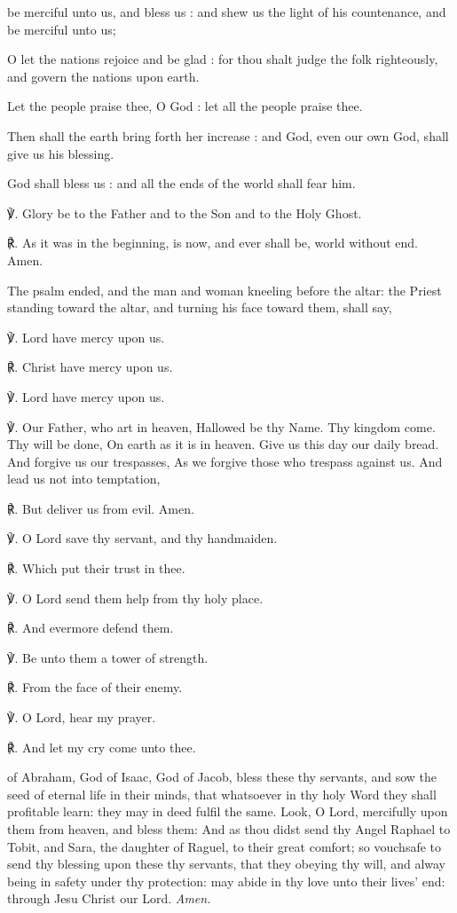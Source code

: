  be merciful unto us, and bless us : and shew us the light of his countenance, and be merciful unto us;\par
{}
O let the nations rejoice and be glad : for thou shalt judge the folk righteously, and govern the nations upon earth.\par
{}Let the people praise thee, O God : let all the people praise thee.\par
{}Then shall the earth bring forth her increase : and God, even our own God, shall give us his blessing.\par
{}God shall bless us : and all the ends of the world shall fear him.\par
    ℣. Glory be to the Father and to the Son and to the Holy Ghost.\par
    ℟. As it was in the beginning, is now, and ever shall be, world without end. Amen.
\begin{rubric}
	The psalm ended, and the man and woman kneeling before the altar: the Priest standing toward the altar, and turning his face toward them, shall say,
\end{rubric}
℣. Lord have mercy upon us.\par
℟. Christ have mercy upon us.\par
℣. Lord have mercy upon us.\par
℣. Our Father, who art in heaven, Hallowed be thy Name. Thy kingdom come. Thy will be done, On earth as it is in heaven. Give us this day our daily bread. And forgive us our trespasses, As we forgive those who trespass against us. And lead us not into temptation,\par
℟. But deliver us from evil. Amen.\par
℣. O Lord save thy servant, and thy handmaiden.\par
℟. Which put their trust in thee.\par
℣. O Lord send them help from thy holy place.\par
℟. And evermore defend them.\par
℣. Be unto them a tower of strength.\par
℟. From the face of their enemy.\par
℣. O Lord, hear my prayer.\par
℟. And let my cry come unto thee.\par
{}
{} of Abraham, God of Isaac, God of Jacob, bless these thy servants, and sow the seed of eternal life in their minds, that whatsoever in thy holy Word they shall profitable learn: they may in deed fulfil the same. Look, O Lord, mercifully upon them from heaven, and bless them: And as thou didst send thy Angel Raphael to Tobit, and Sara, the daughter of Raguel, to their great comfort; so vouchsafe to send thy blessing upon these thy servants, that they obeying thy will, and alway being in safety under thy protection: may abide in thy love unto their lives' end: through Jesu Christ our Lord. \textit{Amen.}

